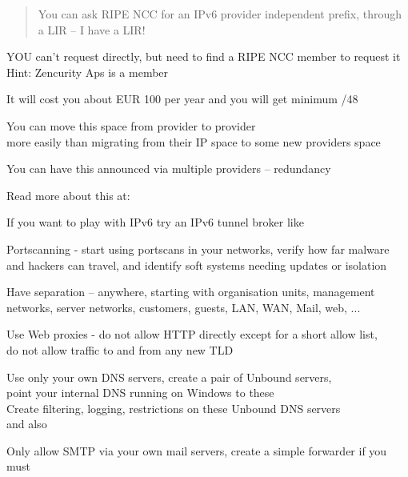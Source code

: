 \documentclass[Screen16to9,17pt]{foils}
\begin{document}


\begin{quote}
You can ask RIPE NCC for an IPv6 provider independent prefix, through a LIR -- I have a LIR!
\end{quote}

\begin{list2}
\item YOU can't request directly, but need to find a RIPE NCC member to request it\\
Hint: Zencurity Aps is a member
\item It will cost you about EUR 100 per year and you will get minimum /48
\item You can move this space from provider to provider\\
more easily than migrating from their IP space to some new providers space
\item You can have this announced via multiple providers -- redundancy
\item Read more about this at:\\
\item If you want to play with IPv6 try an IPv6 tunnel broker like\\
\end{list2}





\begin{list2}
\item Portscanning - start using portscans in your networks, verify how far malware and hackers can travel, and identify soft systems needing updates or isolation
\item Have separation -- anywhere, starting with organisation units, management networks, server networks, customers, guests, LAN, WAN, Mail, web, ...
\item Use Web proxies - do not allow HTTP directly except for a short allow list, \\
do not allow traffic to and from any new TLD
\item Use only your own DNS servers, create a pair of Unbound servers, \\
point your internal DNS running on Windows to these\\
Create filtering, logging, restrictions on these Unbound DNS servers\\
 and also 
\item Only allow SMTP via your own mail servers, create a simple forwarder if you must
\end{list2}
\end{document}
